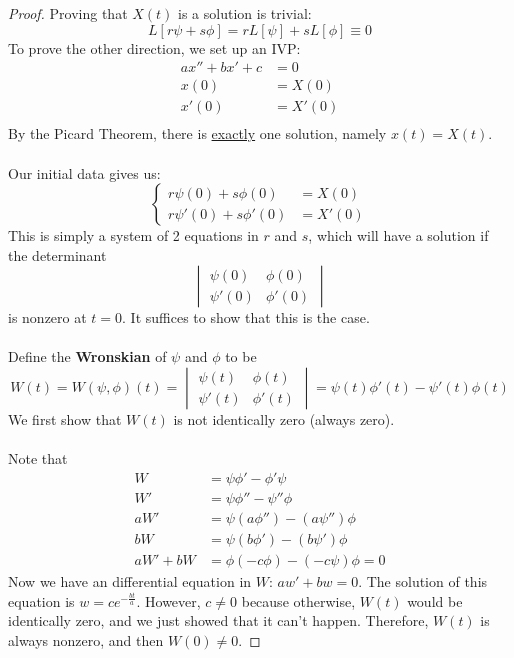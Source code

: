 \documentclass[12pt]{article}
\begin{document}
\begin{proof}
Proving that $X(t)$ is a solution is trivial:
\[ L[r\psi + s\phi] = rL[\psi] + sL[\phi] \equiv 0 \]
To prove the other direction, we set up an IVP:
\[
\begin{aligned}
  ax'' + bx' + c &= 0 \\
  x(0) &= X(0) \\
  x'(0) &= X'(0) \\
\end{aligned}
\]
By the Picard Theorem, there is \underline{exactly} one solution, namely $x(t) = X(t)$. \\ \\
Our initial data gives us:
\[
\begin{cases}
  r\psi(0) + s\phi(0) &= X(0) \\
  r\psi'(0) + s\phi'(0) &= X'(0)
\end{cases}
\]
This is simply a system of 2 equations in $r$ and $s$, which will have a solution if the determinant
\[
\begin{vmatrix}
\psi(0) & \phi(0) \\
\psi'(0) & \phi'(0)
\end{vmatrix}
\]
is nonzero at $t=0$. It suffices to show that this is the case. \\ \\
Define the \textbf{Wronskian} of $\psi$ and $\phi$ to be
\[
W(t) = W(\psi,\phi)(t) = \begin{vmatrix}
\psi(t) & \phi(t) \\
\psi'(t) & \phi'(t)
\end{vmatrix} = \psi(t)\phi'(t) - \psi'(t)\phi(t)
\]
We first show that $W(t)$ is not identically zero (always zero). \\ \\ %
Note that
\[
\begin{aligned}
  W &= \psi\phi' - \phi'\psi \\
  W' &= \psi\phi'' - \psi''\phi \\
  aW' &= \psi(a\phi'') - (a\psi'')\phi \\
  bW &= \psi(b\phi') - (b\psi')\phi \\
  aW' + bW &= \phi(-c\phi) - (-c\psi)\phi = 0
\end{aligned}
\]
Now we have an differential equation in $W$: $aw' + bw = 0$. The solution of this equation is $w = ce^{-\frac{bt}{a}}$. However, $c\neq 0$ because otherwise, $W(t)$ would be identically zero, and we just showed that it can't happen. Therefore, $W(t)$ is always nonzero, and then $W(0) \neq 0$. 
\end{proof}
\end{document}
